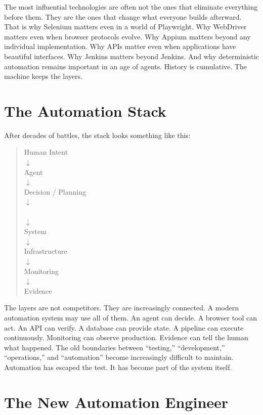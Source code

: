 \documentclass[11pt,twoside]{book}
\begin{document}
The most influential technologies are often not the ones that eliminate everything before them.
They are the ones that change what everyone builds afterward.
That is why Selenium matters even in a world of Playwright.
Why WebDriver matters even when browser protocols evolve.
Why Appium matters beyond any individual implementation.
Why APIs matter even when applications have beautiful interfaces.
Why Jenkins matters beyond Jenkins.
And why deterministic automation remains important in an age of agents.
History is cumulative.
The machine keeps the layers.

\section*{The Automation Stack}

After decades of battles, the stack looks something like this:

\begin{quote}
\centering
Human Intent\\
$\downarrow$\\
Agent\\
$\downarrow$\\
Decision / Planning\\
$\downarrow$\\
\\
$\downarrow$\\
System\\
$\downarrow$\\
Infrastructure\\
$\downarrow$\\
Monitoring\\
$\downarrow$\\
Evidence
\end{quote}

The layers are not competitors.
They are increasingly connected.
A modern automation system may use all of them.
An agent can decide.
A browser tool can act.
An API can verify.
A database can provide state.
A pipeline can execute continuously.
Monitoring can observe production.
Evidence can tell the human what happened.
The old boundaries between ``testing,'' ``development,'' ``operations,'' and ``automation'' become increasingly difficult to maintain.
Automation has escaped the test.
It has become part of the system itself.

\section*{The New Automation Engineer}
\end{document}
